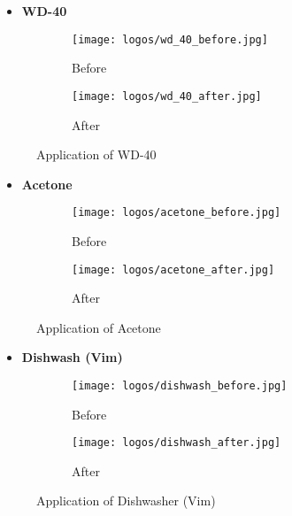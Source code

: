 \documentclass[table,french,english]{rapportCS}
\begin{document}
\begin{itemize}[label=$\bullet$]
        \item \textbf{WD-40} 
    \end{itemize}
\begin{figure}[h]
    \centering
    \begin{subfigure}{0.37\textwidth}
        \centering
        \texttt{[image: logos/wd\_40\_before.jpg]}
        \caption{Before}
    \end{subfigure}\hspace{0.1\textwidth}%
    \begin{subfigure}{0.37\textwidth}
        \centering
        \texttt{[image: logos/wd\_40\_after.jpg]}
        \caption{After}
    \end{subfigure}
    \caption{Application of WD-40}
\end{figure}
\begin{itemize}[label=$\bullet$]
        \item \textbf{Acetone} 
    \end{itemize}
\begin{figure}[h]
    \centering
    \begin{subfigure}{0.37\textwidth}
        \centering
        \texttt{[image: logos/acetone\_before.jpg]}
        \caption{Before}
    \end{subfigure}\hspace{0.1\textwidth}%
    \begin{subfigure}{0.37\textwidth}
        \centering
        \texttt{[image: logos/acetone\_after.jpg]}
        \caption{After}
    \end{subfigure}
    \caption{Application of Acetone}
\end{figure}
\newpage

\begin{itemize}[label=$\bullet$]
        \item \textbf{Dishwash (Vim)} 
    \end{itemize}
\begin{figure}[h]
    \centering
    \begin{subfigure}{0.37\textwidth}
        \centering
        \texttt{[image: logos/dishwash\_before.jpg]}
        \caption{Before}
    \end{subfigure}\hspace{0.1\textwidth}%
    \begin{subfigure}{0.37\textwidth}
        \centering
        \texttt{[image: logos/dishwash\_after.jpg]}
        \caption{After}
    \end{subfigure}
    \caption{Application of Dishwasher (Vim)}
\end{figure}
\end{document}
